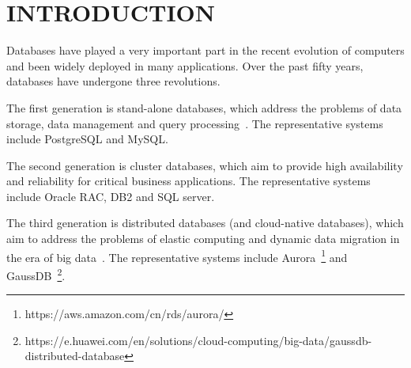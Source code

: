
\section{INTRODUCTION}
\label{sec: introduction}


Databases have played a very important part in the recent evolution of computers and been widely deployed in many applications. Over the past fifty years, databases have undergone three revolutions. 

 The first generation is stand-alone databases, which address the problems of data storage, data management and query processing~\cite{DBLP:books/daglib/0006734}. The representative systems include PostgreSQL and MySQL. 
	

 The second generation is cluster databases, which aim to provide high availability and reliability for critical business applications. The representative systems include Oracle RAC, DB2 and SQL server. 
 

The third generation is distributed databases (and cloud-native databases), which aim to address the problems of elastic computing and dynamic data migration in the era of big data~\cite{DBLP:journals/jidm/FigueiredoBM10}. The representative systems include Aurora~\footnote{https://aws.amazon.com/cn/rds/aurora/} and GaussDB~\footnote{https://e.huawei.com/en/solutions/cloud-computing/big-data/gaussdb-distributed-database}. 
	

